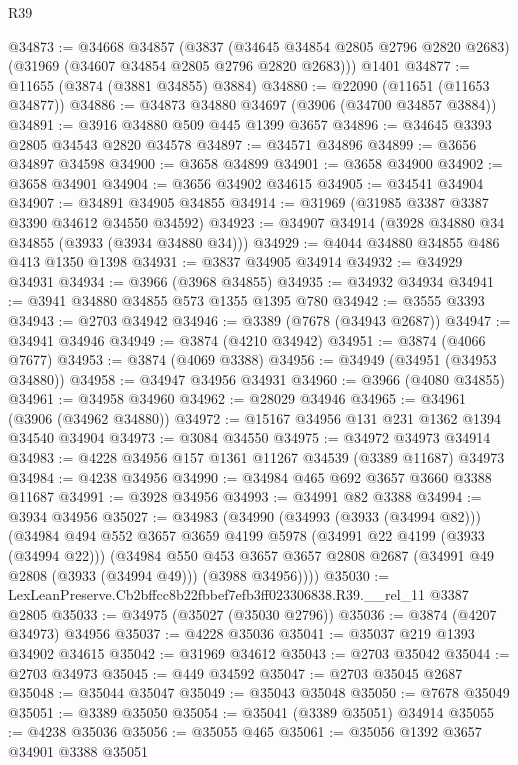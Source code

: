 \begin{lexlean}{R39}
\begin{coremodule}
@34873 := @34668
    @34857
    (@3837 (@34645 @34854 @2805 @2796 @2820 @2683) (@31969 (@34607 @34854 @2805 @2796 @2820 @2683)))
    @1401
@34877 := @11655 (@3874 (@3881 @34855) @3884)
@34880 := @22090 (@11651 (@11653 @34877))
@34886 := @34873 @34880 @34697 (@3906 (@34700 @34857 @3884))
@34891 := @3916 @34880 @509 @445 @1399 @3657
@34896 := @34645 @3393 @2805 @34543 @2820 @34578
@34897 := @34571 @34896
@34899 := @3656 @34897 @34598
@34900 := @3658 @34899
@34901 := @3658 @34900
@34902 := @3658 @34901
@34904 := @3656 @34902 @34615
@34905 := @34541 @34904
@34907 := @34891 @34905 @34855
@34914 := @31969 (@31985 @3387 @3387 @3390 @34612 @34550 @34592)
@34923 := @34907 @34914 (@3928 @34880 @34 @34855 (@3933 (@3934 @34880 @34)))
@34929 := @4044 @34880 @34855 @486 @413 @1350 @1398
@34931 := @3837 @34905 @34914
@34932 := @34929 @34931
@34934 := @3966 (@3968 @34855)
@34935 := @34932 @34934
@34941 := @3941 @34880 @34855 @573 @1355 @1395 @780
@34942 := @3555 @3393
@34943 := @2703 @34942
@34946 := @3389 (@7678 (@34943 @2687))
@34947 := @34941 @34946
@34949 := @3874 (@4210 @34942)
@34951 := @3874 (@4066 @7677)
@34953 := @3874 (@4069 @3388)
@34956 := @34949 (@34951 (@34953 @34880))
@34958 := @34947 @34956 @34931
@34960 := @3966 (@4080 @34855)
@34961 := @34958 @34960
@34962 := @28029 @34946
@34965 := @34961 (@3906 (@34962 @34880))
@34972 := @15167 @34956 @131 @231 @1362 @1394 @34540 @34904
@34973 := @3084 @34550
@34975 := @34972 @34973 @34914
@34983 := @4228 @34956 @157 @1361 @11267 @34539 (@3389 @11687) @34973
@34984 := @4238 @34956
@34990 := @34984 @465 @692 @3657 @3660 @3388 @11687
@34991 := @3928 @34956
@34993 := @34991 @82 @3388
@34994 := @3934 @34956
@35027 := @34983
    (@34990
      (@34993 (@3933 (@34994 @82)))
      (@34984
        @494
        @552
        @3657
        @3659
        @4199
        @5978
        (@34991 @22 @4199 (@3933 (@34994 @22)))
        (@34984
          @550
          @453
          @3657
          @3657
          @2808
          @2687
          (@34991 @49 @2808 (@3933 (@34994 @49)))
          (@3988 @34956))))
@35030 := LexLeanPreserve.Cb2bffcc8b22fbbef7efb3ff023306838.R39.__rel_11 @3387 @2805
@35033 := @34975 (@35027 (@35030 @2796))
@35036 := @3874 (@4207 @34973) @34956
@35037 := @4228 @35036
@35041 := @35037 @219 @1393 @34902 @34615
@35042 := @31969 @34612
@35043 := @2703 @35042
@35044 := @2703 @34973
@35045 := @449 @34592
@35047 := @2703 @35045 @2687
@35048 := @35044 @35047
@35049 := @35043 @35048
@35050 := @7678 @35049
@35051 := @3389 @35050
@35054 := @35041 (@3389 @35051) @34914
@35055 := @4238 @35036
@35056 := @35055 @465
@35061 := @35056 @1392 @3657 @34901 @3388 @35051

\end{coremodule}
\end{lexlean}
